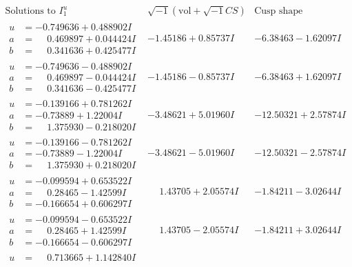 \documentclass[1p]{elsarticle_modified}
\theoremstyle{definition}
\newcommand{\I}{\sqrt{-1}}
\begin{document}
$$\begin{array}{c|c|c}  
\text{Solutions to }I^u_{1}& \I (\text{vol} + \sqrt{-1}CS) & \text{Cusp shape}\\
 \hline 
\begin{aligned}
u &= -0.749636 + 0.488902 I \\
a &= \phantom{-}0.469897 + 0.044424 I \\
b &= \phantom{-}0.341636 + 0.425477 I\end{aligned}
 & -1.45186 + 0.85737 I & -6.38463 - 1.62097 I \\ \hline\begin{aligned}
u &= -0.749636 - 0.488902 I \\
a &= \phantom{-}0.469897 - 0.044424 I \\
b &= \phantom{-}0.341636 - 0.425477 I\end{aligned}
 & -1.45186 - 0.85737 I & -6.38463 + 1.62097 I \\ \hline\begin{aligned}
u &= -0.139166 + 0.781262 I \\
a &= -0.73889 + 1.22004 I \\
b &= \phantom{-}1.375930 - 0.218020 I\end{aligned}
 & -3.48621 + 5.01960 I & -12.50321 + 2.57874 I \\ \hline\begin{aligned}
u &= -0.139166 - 0.781262 I \\
a &= -0.73889 - 1.22004 I \\
b &= \phantom{-}1.375930 + 0.218020 I\end{aligned}
 & -3.48621 - 5.01960 I & -12.50321 - 2.57874 I \\ \hline\begin{aligned}
u &= -0.099594 + 0.653522 I \\
a &= \phantom{-}0.28465 - 1.42599 I \\
b &= -0.166654 + 0.606297 I\end{aligned}
 & \phantom{-}1.43705 + 2.05574 I & -1.84211 - 3.02644 I \\ \hline\begin{aligned}
u &= -0.099594 - 0.653522 I \\
a &= \phantom{-}0.28465 + 1.42599 I \\
b &= -0.166654 - 0.606297 I\end{aligned}
 & \phantom{-}1.43705 - 2.05574 I & -1.84211 + 3.02644 I \\ \hline\begin{aligned}
u &= \phantom{-}0.713665 + 1.142840 I \\

\end{aligned}
\end{array}$$
\end{document}

